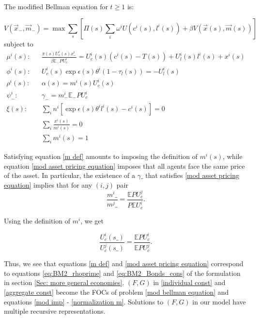\documentclass[thmsb,11pt]{article}
\newcommand{\EE}{\mathbb E}
\begin{document}
\noindent The modified Bellman equation for $t\geq 1$ is:



\begin{equation}\label{mod bellman equation}
	V(\vec{x}_-,\vec{m}_{-}) = \max \sum_{s}\left[ \Pi(s) \sum_i \omega^iU(c^i(s),l^i(s)) + \beta V(\vec{x}(s),\vec{m}(s))\right]
\end{equation}
subject to
\begin{align}
\mu^i(s):&&	\frac{\pi(s)U^i_c(s) x^i_{-} }{\beta\EE_- PU^i_c} = U^i_c(s)(c^i(s)-T(s)) + U^i_l(s) l^i(s) + x^i(s)\\\label{mod imp}
\phi^i(s):&&	U^i_c(s)\exp{\epsilon(s)}\theta^i(1-\tau_l(s)) = -U^i_l(s)\\
\rho^i(s):&&	\alpha(s) = m^i(s) U^i_c(s)\\ \label{m def}
\psi^i_{-}:&&	\gamma_-=  m^i_-\EE_- P U^i_c\\ \label{mod asset pricing equation}
\xi(s):&&	\sum_in^i\left[\exp{\epsilon(s)}\theta^il^i(s) - c^i(s)\right] =0\\
	&&\sum_i \frac{x^i(s)}{m^i(s)} = 0\\
	&&\sum_i m^i(s) = 1 \label{normalization m}
\end{align}


Satisfying equation \eqref{m def}  amounts to imposing the definition of $m^i(s)$,  while equation \eqref{mod asset pricing equation} imposes that all agents face the same  price of the asset. In particular, the existence of a $\gamma\_$ that satisfies \eqref{mod asset pricing equation} implies that for any $(i,j)$ pair
\[\frac{m^i\_}{m^j\_}=\frac{\mathbb{E}P U_c^j}{P \mathbb{E} U^i_c}.\]

\noindent Using the definition of $m^i$, we get

\[\frac{U^i_c(s\_)}{U^j_c(s\_)}=\frac{\mathbb{E}P U_c^i}{\mathbb{E}P U_c^j}.\]

\noindent Thus, we see that  equations \eqref{m def} and \eqref{mod asset pricing equation} correspond to equations \eqref{eq:BM2_rhoprime} and \eqref{eq:BM2_Bonds_cons} of the formulation in section \ref{Sec: more general economies}.
$\left(F,G\right)$  in \eqref{individual const} and \eqref{aggregate const} become the FOCs of problem \eqref{mod bellman equation} and equations \eqref{mod imp} - \eqref{normalization m}. Solutions to $\left(F,G\right)$ in our model have multiple recursive representations.
\end{document}
